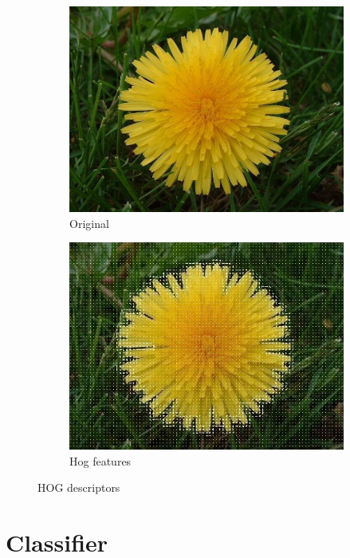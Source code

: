 \documentclass[11]{article}
\begin{document}
\begin{figure}[H]
    \begin{subfigure}[t]{0.45\textwidth}
    \centering
  \includegraphics[scale=0.234]{images/originalhogg.jpg}
    \caption{Original}
    \label{originalhogg}
    \end{subfigure}
    \begin{subfigure}[t]{0.45\textwidth}
    \centering
    \includegraphics[scale=0.345]{images/hogg.jpg}
    \caption{Hog features}
    \label{hogg2}
    \end{subfigure}
    \label{hogg}
    \caption{HOG descriptors}
\end{figure}



\section{Classifier}
\end{document}
